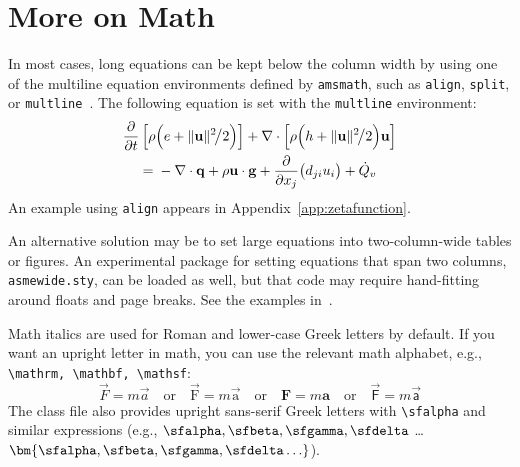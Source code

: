 \documentclass[subscriptcorrection,upint,varvw,barcolor=Goldenrod3,mathalfa=cal=euler,balance,hyphenate,french,pdf-a]{asmejour} %
\begin{document}
\section{More on Math}

In most cases, long equations can be kept below the column width by using one of the multiline equation environments defined by \texttt{amsmath}, 
such as \texttt{align}, \texttt{split}, or \texttt{multline}~\cite{amsmath}. The following equation is set with the \texttt{multline} environment:
\begin{multline}
\frac{\partial}{\partial t}\left[\rho\Bigl(e + \lVert\mathbf{u}\rVert^2\mspace{-3mu}\big/2\Bigr)\right]  + \nabla\cdot\left[\rho\Bigl(h + \lVert\mathbf{u}\rVert^2\mspace{-3mu}\big/2 \Bigr)\mathbf{u}\right]\\
 ={}-\nabla \cdot \mathbf{q} +  \rho \mathbf{u}\cdot\mathbf{g}+ \frac{\partial}{\partial x_j}\bigl(d_{ji}u_i\bigr) + \dot{Q}_v\label{eqn:energy}
\end{multline}
An example using \texttt{align} appears in Appendix~\ref{app:zetafunction}. 

An alternative solution may be to set large equations into two-column-wide tables or figures. An experimental package for setting equations that span two columns, \texttt{asmewide.sty}, can be loaded as well, but that code may require hand-fitting around floats and page breaks. See the examples in~\cite{lienhard2022}.

Math italics are used for Roman and lower-case Greek letters by default.  If you want an upright letter in math, you can use the relevant math alphabet, e.g., \verb|\mathrm, \mathbf, \mathsf|:
\begin{equation}\label{eqn:newton2}
\vec{F} = m \vec{a} \quad\textrm{or}\quad \vec{\mathrm{F}} = m \vec{\mathrm{a}} \quad\textrm{or}\quad \mathbf{F} = m \mathbf{a} \quad\textrm{or}\quad \vec{\mathsf{F}} = m \vec{\mathsf{a}}
\end{equation}
The class file also provides upright sans-serif Greek letters with \verb|\sfalpha| and similar expressions (e.g., $\sfalpha, \sfbeta, \sfgamma, \sfdelta$ \ldots $\bm{\sfalpha, \sfbeta, \sfgamma, \sfdelta \ldots}$). 
\end{document}
